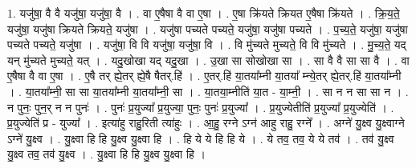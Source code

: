 \documentclass[17pt]{extarticle}
\begin{document}
1. यजु॑षा॒ वै वै यजु॑षा॒ यजु॑षा॒ वै । . वा ए॒षैषा वै वा ए॒षा । . ए॒षा क्रि॑यते क्रियत ए॒षैषा क्रि॑यते । . क्रि॒य॒ते॒ यजु॑षा॒ यजु॑षा क्रियते क्रियते॒ यजु॑षा । . यजु॑षा पच्यते पच्यते॒ यजु॑षा॒ यजु॑षा पच्यते । . प॒च्य॒ते॒ यजु॑षा॒ यजु॑षा पच्यते पच्यते॒ यजु॑षा । . यजु॑षा॒ वि वि यजु॑षा॒ यजु॑षा॒ वि । . वि मु॑च्यते मुच्यते॒ वि वि मु॑च्यते । . मु॒च्य॒ते॒ यद् यन् मु॑च्यते मुच्यते॒ यत् । . यदु॒खोखा यद् यदु॒खा । . उ॒खा सा सोखोखा सा । . सा वै वै सा सा वै । . वा ए॒षैषा वै वा ए॒षा । . ए॒षै तर् ह्ये॒तर् ह्ये॒षै षैतर्.हि॑ । . ए॒तर्.हि॑ या॒तया᳚म्नी या॒तया᳚ म्न्ये॒तर् ह्ये॒तर्.हि॑ या॒तया᳚म्नी । . या॒तया᳚म्नी॒ सा सा या॒तया᳚म्नी या॒तया᳚म्नी॒ सा । . या॒तया॒म्नीति॑ या॒त - या॒म्नी॒ । . सा न न सा सा न । . न पुनः॒ पुन॒र् न न पुनः॑ । . पुनः॑ प्र॒युज्या᳚ प्र॒युज्या॒ पुनः॒ पुनः॑ प्र॒युज्या᳚ । . प्र॒युज्येतीति॑ प्र॒युज्या᳚ प्र॒युज्येति॑ । . प्र॒युज्येति॑ प्र - युज्या᳚ । . इत्या॑हु राहु॒रिती त्या॑हुः । . आ॒हु॒ रग्ने ऽग्न॑ आहु राहु॒ रग्ने᳚ । . अग्ने॑ यु॒क्ष्व यु॒क्ष्वाग्ने ऽग्ने॑ यु॒क्ष्व । . यु॒क्ष्वा हि हि यु॒क्ष्व यु॒क्ष्वा हि । . हि ये ये हि हि ये । . ये तव॒ तव॒ ये ये तव॑ । . तव॑ यु॒क्ष्व यु॒क्ष्व तव॒ तव॑ यु॒क्ष्व । . यु॒क्ष्वा हि हि यु॒क्ष्व यु॒क्ष्वा हि । \newline
\end{document}
